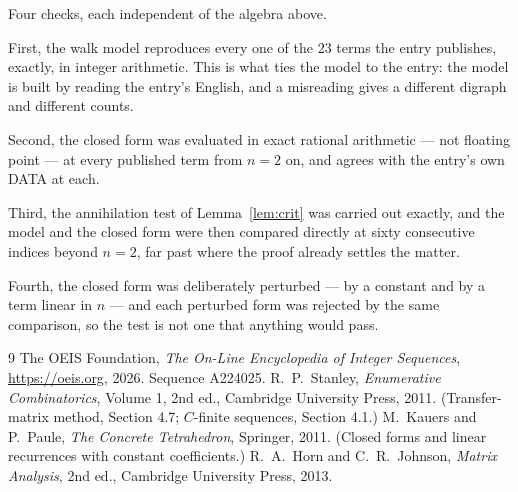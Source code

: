 \documentclass[11pt,a4paper]{article}
\theoremstyle{plain}
\theoremstyle{definition}
\begin{document}
Four checks, each independent of the algebra above.

First, the walk model reproduces every one of the $23$ terms the entry publishes,
exactly, in integer arithmetic. This is what ties the model to the entry: the model is built
by reading the entry's English, and a misreading gives a different digraph and different
counts.

Second, the closed form was evaluated in exact rational arithmetic --- not floating point ---
at every published term from $n=2$ on, and agrees with the entry's own DATA at each.

Third, the annihilation test of Lemma~\ref{lem:crit} was carried out exactly, and the model
and the closed form were then compared directly at sixty consecutive indices beyond
$n=2$, far past where the proof already settles the matter.

Fourth, the closed form was deliberately perturbed --- by a constant and by a term linear in
$n$ --- and each perturbed form was rejected by the same comparison, so the test is not one
that anything would pass.

\begin{thebibliography}{9}
 The OEIS Foundation, \emph{The On-Line Encyclopedia of Integer
Sequences}, \url{https://oeis.org}, 2026. Sequence A224025.
 R.~P.~Stanley, \emph{Enumerative Combinatorics}, Volume 1, 2nd ed.,
Cambridge University Press, 2011. (Transfer-matrix method, Section 4.7; $C$-finite sequences,
Section 4.1.)
 M.~Kauers and P.~Paule, \emph{The Concrete Tetrahedron}, Springer, 2011.
(Closed forms and linear recurrences with constant coefficients.)
 R.~A.~Horn and C.~R.~Johnson, \emph{Matrix Analysis}, 2nd ed., Cambridge
University Press, 2013.
\end{thebibliography}
\end{document}
